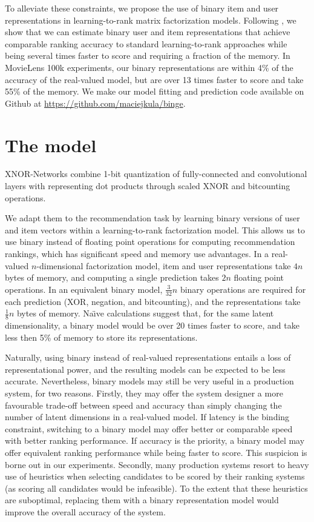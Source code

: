 \documentclass[sigchi]{acmart}
\begin{document}
To alleviate these constraints, we propose the use of binary item and user representations in learning-to-rank matrix factorization models. Following \citet{rastegari2016xnor}, we show that we can estimate binary user and item representations that achieve comparable ranking accuracy to standard learning-to-rank approaches while being several times faster to score and requiring a fraction of the memory. In MovieLens 100k experiments, our binary representations are within 4\% of the accuracy of the real-valued model, but are over 13 times faster to score and take 55\% of the memory. We make our model fitting and prediction code available on Github at \url{https://github.com/maciejkula/binge}.

\section{The model}
\label{sec:approach}
XNOR-Networks \citep{rastegari2016xnor} combine 1-bit quantization of fully-connected and convolutional layers with representing dot products through scaled XNOR and bitcounting operations.

We adapt them to the recommendation task by learning binary versions of user and item vectors within a learning-to-rank factorization model. This allows us to use binary instead of floating point operations for computing recommendation rankings, which has significant speed and memory use advantages. In a real-valued $n$-dimensional factorization model, item and user representations take $4n$ bytes of memory, and computing a single prediction takes $2n$ floating point operations. In an equivalent binary model, $\frac{3}{32}n$ binary operations are required for each prediction (XOR, negation, and bitcounting), and the representations take $\frac{1}{8}n$ bytes of memory. Na{\"\i}ve calculations suggest that, for the same latent dimensionality, a binary model would be over 20 times faster to score, and take less then 5\% of memory to store its representations.

Naturally, using binary instead of real-valued representations entails a loss of representational power, and the resulting models can be expected to be less accurate. Nevertheless, binary models may still be very useful in a production system, for two reasons. Firstly, they may offer the system designer a more favourable trade-off between speed and accuracy than simply changing the number of latent dimensions in a real-valued model. If latency is the binding constraint, switching to a binary model may offer better or comparable speed with better ranking performance. If accuracy is the priority, a binary model may offer equivalent ranking performance while being faster to score. This suspicion is borne out in our experiments. Secondly, many production systems resort to heavy use of heuristics when selecting candidates to be scored by their ranking systems (as scoring all candidates would be infeasible). To the extent that these heuristics are suboptimal, replacing them with a binary representation model would improve the overall accuracy of the system.
\end{document}

